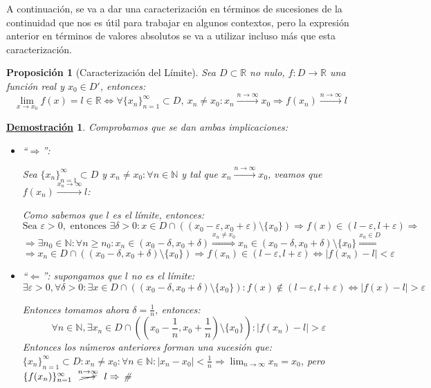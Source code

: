 \documentclass[10pt,a4paper,openright]{book}
\theoremstyle{break}
\newtheorem{prop}{Proposición}[chapter]
\newtheorem*{demo}{\underline{Demostración}}
\begin{document}
A continuación, se va a dar una caracterización en términos de sucesiones de la continuidad que nos es útil para trabajar en algunos contextos, pero la expresión anterior en términos de valores absolutos se va a utilizar incluso más que esta caracterización.

\begin{prop}[Caracterización del Límite]
Sea $D\subset \mathbb R$ no nulo, $f:D\longrightarrow \mathbb R$ una función real y $x_0\in D'$, entonces:
\[
\lim_{x\rightarrow x_0} f(x)=l\in \mathbb R \Leftrightarrow \forall \{x_n\}_{n=1}^\infty\subset D, \ x_n\neq x_0: x_n\xrightarrow{n\rightarrow \infty} x_0\Rightarrow 	f(x_n)\xrightarrow{n\rightarrow \infty} l
\]
\end{prop}
\begin{demo}
Comprobamos que se dan ambas implicaciones:
	\begin{itemize}
	\item ``$\Rightarrow$'': \par
	Sea $\{x_n\}_{n=1}^\infty\subset D$ y $x_n\neq x_0: \forall n\in \mathbb N$ y tal que $x_n\xrightarrow{n\rightarrow \infty} x_0$, veamos que $f(x_n)\xrightarrow{x_n\rightarrow \infty} l$:
	
	Como sabemos que $l$ es el límite, entonces:
	$$\mbox{Sea }\varepsilon>0,\mbox{ entonces } \exists \delta >0: x\in D\cap \left((x_0-\varepsilon, x_0+\varepsilon)\mbox{\textbackslash} \{x_0\}\right)\Rightarrow f(x)\in (l-\varepsilon, l+\varepsilon)\Rightarrow$$
	$$\Rightarrow \exists n_0\in \mathbb N: \forall n\geq n_0: x_n \in (x_0-\delta, x_0+\delta)\stackrel{x_n\neq x_0}{\Rightarrow}x_n \in (x_0-\delta, x_0+\delta)\mbox{\textbackslash}\{x_0\}\stackrel{x_n\in D}{\Rightarrow}$$
	$$\Rightarrow  x_n \in D\cap\left((x_0-\delta, x_0+\delta)\mbox{\textbackslash}\{x_0\}\right)\Rightarrow f(x_n)\in (l-\varepsilon, l+\varepsilon)\Leftrightarrow |f(x_n)-l|<\varepsilon$$
	
	\item ``$\Leftarrow$'': supongamos que $l$ no es el límite:
	$$\exists \varepsilon>0, \forall \delta>0: \exists x\in D\cap \left((x_0-\delta, x_0+\delta)\mbox{\textbackslash} \{x_0\}\right): f(x)\notin (l-\varepsilon, l+\varepsilon)\Leftrightarrow |f(x)-l|>\varepsilon$$
	
	Entonces tomamos ahora $\delta=\frac{1}{n}$, entonces:
	$$\forall n\in \mathbb N, \exists x_n\in D\cap \left((x_0-\frac{1}{n}, x_0+\frac{1}{n})\mbox{\textbackslash} \{x_0\}\right): |f(x_n)-l|>\varepsilon$$
	Entonces los números anteriores forman una sucesión que: $\{x_n\}_{n=1}^\infty\subset D: x_n\neq x_0: \forall n\in \mathbb N: |x_n-x_0|<\frac{1}{n}\Rightarrow \lim_{n\rightarrow\infty} x_n=x_0$, pero $\{f(x_n)\}_{n=1}^\infty \mbox{ }\stackrel{n\rightarrow\infty}{\cancel{\longrightarrow}}\mbox{ } l\Rightarrow$ \#	
	\end{itemize}
\end{demo}
\end{document}
